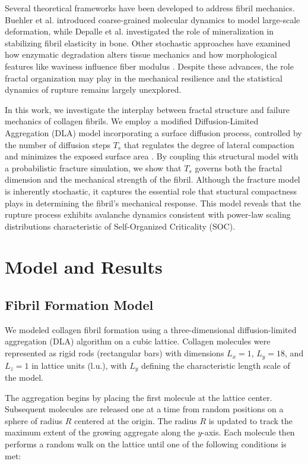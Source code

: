 \documentclass[aps,physrev,preprint,groupedaddress,linenumbers]{revtex4-2}
\begin{document}
Several theoretical frameworks have been developed to address fibril mechanics. Buehler et al. introduced coarse-grained molecular dynamics to model large-scale deformation, while Depalle et al. investigated the role of mineralization in stabilizing fibril elasticity in bone\cite{Buehler2006a,Buehler2006b,Buehler2008a,Buehler2008b,Depalle2016}. Other stochastic approaches have examined how enzymatic degradation alters tissue mechanics \cite{Arau2011} and how morphological features like waviness influence fiber modulus \cite{Deng2024}. Despite these advances, the role fractal organization may play in the mechanical resilience and the statistical dynamics of rupture remains largely unexplored.

In this work, we investigate the interplay between fractal structure and failure mechanics of collagen fibrils. We employ a modified Diffusion-Limited Aggregation (DLA) model incorporating a surface diffusion process, controlled by the number of diffusion steps $T_s$ that regulates the degree of lateral compaction and minimizes the exposed surface area \cite{Parkinson1995}. By coupling this structural model with a probabilistic fracture simulation, we show that $T_s$ governs both the fractal dimension and the mechanical strength of the fibril. Although the fracture model is inherently stochastic, it captures the essential role that stuctural compactness plays in determining the fibril's mechanical response. This model reveals that the rupture process exhibits avalanche dynamics consistent with power-law scaling distributions characteristic of Self-Organized Criticality (SOC).

\section{Model and Results}
\subsection{Fibril Formation Model}

We modeled collagen fibril formation using a three-dimensional diffusion-limited aggregation (DLA) algorithm on a cubic lattice. Collagen molecules were represented as rigid rods (rectangular bars) with dimensions $L_x = 1$, $L_y = 18$, and $L_z = 1$ in lattice units (l.u.), with $L_y$ defining the characteristic length scale of the model.

The aggregation begins by placing the first molecule at the lattice center. Subsequent molecules are released one at a time from random positions on a sphere of radius $R$ centered at the origin. The radius $R$ is updated to track the maximum extent of the growing aggregate along the $y$-axis. Each molecule then performs a random walk on the lattice until one of the following conditions is met:
\end{document}
